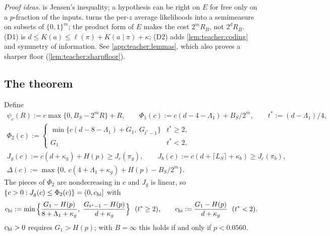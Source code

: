 \emph{Proof ideas.}  is Jensen's inequality; a hypothesis can be right on $E$ for free only on a $p$-fraction of the inputs.  turns the per-$z$ average likelihoods into a semimeasure on subsets of $\{0,1\}^m$; the product form of $E$ makes the cost $2^mR_B$, not $2^dR_B$. (D1) is $d\le K(a)\le\ell(\pi)+K(a\mid\pi)+\kappa$; (D2) adds \cref{lem:teacher:coding} and symmetry of information. See \cref{app:teacher:lemmas}, which also proves a sharper floor (\cref{lem:teacher:sharpfloor}).

\subsection{The theorem}\label{sec:teacher:theorem}

Define
\begin{gather*}
\psi_c(R):=c\max\{0,B_S-2^mR\}+R,\qquad \Phi_1(c):=c(d-4-\Lambda_1)+B_S/2^m,\qquad t^*:=(d-\Lambda_1)/4,\\
\Phi_2(c):=\begin{cases}\min\{c(d-8-\Lambda_1)+G_1,\ G_{t^*-1}\}&t^*\ge2,\\ G_1&t^*<2,\end{cases}\\
J_g(c):=c(d+\kappa_g)+H(p)\ge J_c(\pi_g),\qquad J_b(c):=c(d+\lceil L_S\rceil+\kappa_b)\ge J_c(\pi_b),\\
\Delta(c):=\max\{0,\ c(4+\Lambda_1+\kappa_g)+H(p)-B_S/2^m\}.
\end{gather*}
The pieces of $\Phi_2$ are nondecreasing in $c$ and $J_g$ is linear, so $\{c>0:J_g(c)\le\Phi_2(c)\}=(0,c_{\rm hi}]$ with
\[
c_{\rm hi}:=\min\Big\{\frac{G_1-H(p)}{8+\Lambda_1+\kappa_g},\ \frac{G_{t^*-1}-H(p)}{d+\kappa_g}\Big\}\ \ (t^*\ge2),\qquad c_{\rm hi}:=\frac{G_1-H(p)}{d+\kappa_g}\ \ (t^*<2).
\]
$c_{\rm hi}>0$ requires $G_1>H(p)$; with $B=\infty$ this holds if and only if $p<0.0560$.

